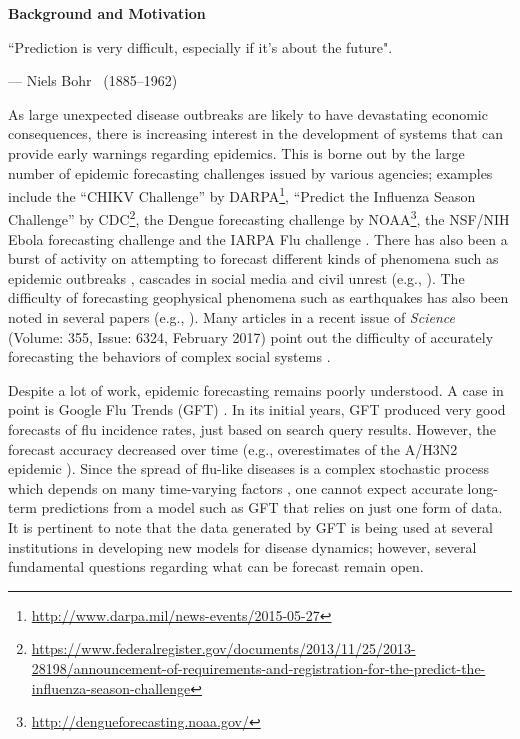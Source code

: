 \noindent
{\Large\textbf{Background and Motivation}}

\epigraph{``Prediction is very difficult, especially if it's about the future".}
{--- \textup{Niels Bohr~ (1885--1962)}}  



\medskip
As large unexpected disease outbreaks are likely to have 
devastating economic consequences, there is increasing interest in
the development of systems that can provide early warnings regarding
epidemics.
This is borne out by the large number of epidemic forecasting challenges 
issued by various agencies; examples include 
the ``CHIKV Challenge'' by 
DARPA\footnote{\url{http://www.darpa.mil/news-events/2015-05-27}},
``Predict the Influenza Season Challenge'' by 
CDC\footnote{\url{https://www.federalregister.gov/documents/2013/11/25/2013-28198/announcement-of-requirements-and-registration-for-the-predict-the-influenza-season-challenge}},
the Dengue forecasting challenge by 
NOAA\footnote{\url{http://dengueforecasting.noaa.gov/}},
the NSF/NIH Ebola forecasting challenge and 
the IARPA Flu challenge \cite{Muthaiah_etal_2016}.
There has also been a burst of activity on attempting to forecast different kinds of
phenomena such as epidemic outbreaks
\cite{nsoesie2013systematic,Nishiura:2011,Ohkusa:2011,Hall:2007,
Vespignani-BMC-2012, chakraborty:sdm14, Scarpino-Petri-2017},
cascades in social media and civil unrest
(e.g., \cite{Martin_etal_2016, Krishnan_etal_2016, Korkmaz_etal_2016,
Ramakrishnan:2014:BNE:2623330.2623373}).
The difficulty of forecasting geophysical phenomena 
such as earthquakes has also been noted in several papers
(e.g., \cite{Geller-1997,Geller-etal-1997}).
Many articles in a recent issue of \emph{Science} 
(Volume: 355, Issue: 6324, February 2017) point out
the difficulty of accurately forecasting the behaviors of
complex social systems \cite{Athey-2017,Bohannon-2017,Cederman-etal-2017,
Clauset-etal-2017,Hofman-etal-2017,Jasny-etal-2017,Kennedy-etal-2017,
Subrahmanian-etal-2017,Tetlock-etal-2017}.

\medskip
Despite a lot of work, epidemic forecasting remains poorly understood.  
A case in point is Google Flu Trends (GFT) 
\cite{ginsberg:nature08:flu-search-engine}. 
In its initial years, GFT
produced very good forecasts of flu incidence rates,
just based on search query results. 
However, the forecast accuracy decreased over time
(e.g., overestimates of the A/H3N2 epidemic
\cite{lazer:science14, olson:ploscb13}).
Since the spread of flu-like diseases is a complex stochastic process 
which depends on many time-varying factors \cite{Drake-2005, Drake-2006},
one cannot expect accurate long-term predictions
from a model such as GFT that relies on just one form of data.
It is pertinent to note that the data generated by GFT is being used at several 
institutions in developing new models for disease dynamics;
however, several fundamental questions regarding 
what can be forecast remain open.

